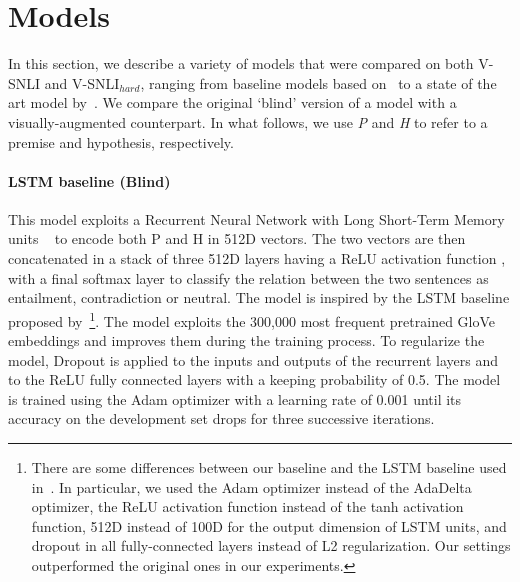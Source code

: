 \documentclass[11pt]{article}
\begin{document}
 \section{Models}
\label{sec:models}
 
In this section, we describe a variety of models that were compared on both V-SNLI and V-SNLI$_{hard}$, ranging from baseline models based on~ to a state of the art model by~. We compare the original `blind' version of a model with a visually-augmented counterpart.
In what follows, we use {\em P} and {\em H} to refer to a premise and hypothesis, respectively.

\paragraph{LSTM baseline (Blind)} This model exploits a Recurrent Neural Network with Long Short-Term Memory units ~\cite{hochreiter1997:lstm} to encode both P and H in 512D vectors. The two vectors are then concatenated in a stack of three 512D layers having a ReLU activation function \cite{nair2010:relu}, with a final softmax layer to classify the relation between the two sentences as entailment, contradiction or neutral. The model is inspired by the LSTM baseline proposed by~\footnote{There are some differences between our baseline and the LSTM baseline used in~\cite{snli:emnlp2015}. In particular, we used the Adam optimizer instead of the AdaDelta optimizer, the ReLU activation function instead of the tanh activation function, 512D instead of 100D for the output dimension of LSTM units, and dropout in all fully-connected layers instead of L2 regularization. Our settings outperformed the original ones in our experiments.}.
The model exploits the 300,000 most frequent pretrained GloVe embeddings \cite{Pennington2014} and improves them during the training process. To regularize the model, Dropout \cite{srivastava2014:dropout} is applied to the inputs and outputs of the recurrent layers and to the ReLU fully connected layers with a keeping probability of 0.5. The model is trained using the Adam
optimizer \cite{kingma2014:adam} with a learning rate of 0.001 until its accuracy on the
development set drops for three successive iterations.
\end{document}

